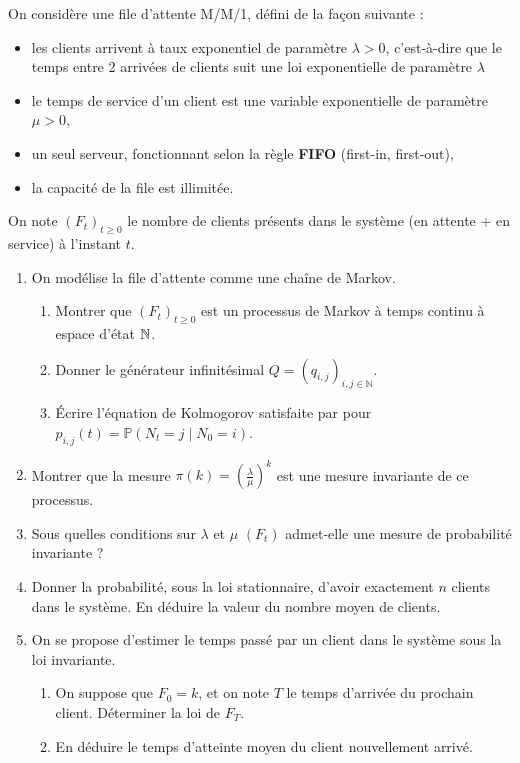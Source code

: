 \documentclass[]{exercices}
\begin{document}
\begin{exercice}
On considère une file d’attente M/M/1, défini de la façon suivante :
\begin{itemize}
    \item les clients arrivent à taux exponentiel de paramètre $\lambda > 0$, c'est-à-dire que le temps entre 2 arrivées de clients suit une loi exponentielle de paramètre $\lambda$
    \item le temps de service d’un client est une {variable exponentielle} de paramètre $\mu > 0$,
    \item un seul serveur, fonctionnant selon la règle \textbf{FIFO} (first-in, first-out),
    \item la capacité de la file est {illimitée}.
\end{itemize}
On note $(F_t)_{t \ge 0}$ le nombre de clients présents dans le système (en attente + en service) à l’instant $t$.
\begin{enumerate}
\item On modélise la file d'attente comme une chaîne de Markov.
\begin{enumerate}
    \item Montrer que $(F_t)_{t \ge 0}$ est un processus de Markov à temps continu à espace d’état $\mathbb{N}$.
    \item Donner le générateur infinitésimal $Q = (q_{i,j})_{i,j \in \mathbb{N}}$.
    \item Écrire l'équation de Kolmogorov satisfaite par pour $p_{i,j}(t) = \mathbb{P}(N_t = j \mid N_0 = i)$.
\end{enumerate}
 \item Montrer que la mesure $\pi(k) = (\frac{\lambda}{\mu})^k$ est une mesure invariante de ce processus.
 \item Sous quelles conditions sur $\lambda$ et $\mu$ $(F_t)$ admet-elle une mesure de probabilité invariante ?
 \item Donner la probabilité, sous la loi stationnaire, d’avoir exactement $n$ clients dans le système. En déduire la valeur du nombre moyen de clients.
 \item On se propose d'estimer le temps passé par un client dans le système sous la loi invariante.
 \begin{enumerate}
   \item On suppose que $F_0 = k$, et on note $T$ le temps d'arrivée du prochain client. Déterminer la loi de $F_T$.
   \item En déduire le temps d'atteinte moyen du client nouvellement arrivé.

\end{enumerate}
\end{enumerate}
\end{exercice}
\end{document}

